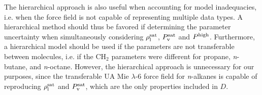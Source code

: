 \documentclass[preprint,letterpaper,floatfix,citeautoscript,aip,jcp]{revtex4-1}
\begin{document}
The hierarchical approach is also useful when accounting for model inadequacies, i.e. when the force field is not capable of representing multiple data types. A hierarchical method should thus be favored if determining the parameter uncertainty when simultaneously considering $\rho_{\rm l}^{\rm sat}$, $P_{\rm v}^{\rm sat}$ and $P^{\rm high}$. Furthermore, a hierarchical model should be used if the parameters are not transferable between molecules, i.e. if the CH$_2$ parameters were different for propane, \textit{n}-butane, and \textit{n}-octane. However, the hierarchical approach is unnecessary for our purposes, since the transferable UA Mie $\lambda$-6 force field for \textit{n}-alkanes is capable of reproducing $\rho_{\rm l}^{\rm sat}$ and $P_{\rm v}^{\rm sat}$, which are the only properties included in $D$. 



\end{document}
